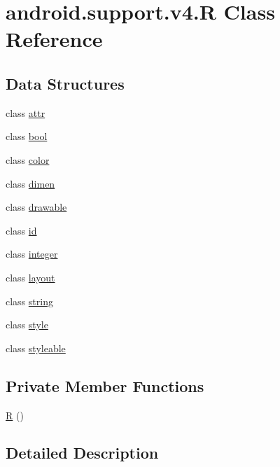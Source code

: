 \hypertarget{classandroid_1_1support_1_1v4_1_1_r}{}\section{android.\+support.\+v4.\+R Class Reference}
\label{classandroid_1_1support_1_1v4_1_1_r}
\subsection*{Data Structures}
\begin{DoxyCompactItemize}
\item 
class \mbox{\hyperlink{classandroid_1_1support_1_1v4_1_1_r_1_1attr}{attr}}
\item 
class \mbox{\hyperlink{classandroid_1_1support_1_1v4_1_1_r_1_1bool}{bool}}
\item 
class \mbox{\hyperlink{classandroid_1_1support_1_1v4_1_1_r_1_1color}{color}}
\item 
class \mbox{\hyperlink{classandroid_1_1support_1_1v4_1_1_r_1_1dimen}{dimen}}
\item 
class \mbox{\hyperlink{classandroid_1_1support_1_1v4_1_1_r_1_1drawable}{drawable}}
\item 
class \mbox{\hyperlink{classandroid_1_1support_1_1v4_1_1_r_1_1id}{id}}
\item 
class \mbox{\hyperlink{classandroid_1_1support_1_1v4_1_1_r_1_1integer}{integer}}
\item 
class \mbox{\hyperlink{classandroid_1_1support_1_1v4_1_1_r_1_1layout}{layout}}
\item 
class \mbox{\hyperlink{classandroid_1_1support_1_1v4_1_1_r_1_1string}{string}}
\item 
class \mbox{\hyperlink{classandroid_1_1support_1_1v4_1_1_r_1_1style}{style}}
\item 
class \mbox{\hyperlink{classandroid_1_1support_1_1v4_1_1_r_1_1styleable}{styleable}}
\end{DoxyCompactItemize}
\subsection*{Private Member Functions}
\begin{DoxyCompactItemize}
\item 
\mbox{\hyperlink{classandroid_1_1support_1_1v4_1_1_r_a254130e1af6c1572edc11c48990a7e01}{R}} ()
\end{DoxyCompactItemize}


\subsection{Detailed Description}


